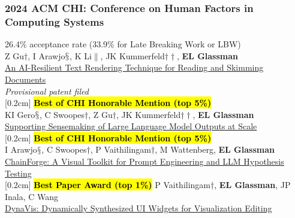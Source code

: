 \documentclass[10pt, a4paper]{article}
\newcommand{\years}[1]{\marginnote{\normalsize #1}}
\begin{document}
\subsubsection*{2024 ACM \textbf{CHI}: Conference on Human Factors in Computing Systems}
26.4\% acceptance rate (33.9\% for Late Breaking Work or LBW)\\

\years{\textbf{C35}} Z Gu$\dagger$, I Arawjo$\mathsection$, K Li$\|$, JK Kummerfeld$\dagger\dagger$, \textbf{EL Glassman}\\ \href{https://glassmanlab.seas.harvard.edu/papers/gptsm.pdf}{An AI-Resilient Text Rendering Technique for Reading and Skimming Documents}\\
\textit{Provisional patent filed}\\
[0.2cm]
\years{\textbf{C34}}\hl{\textbf{Best of CHI Honorable Mention (top 5\%)}}\\ KI Gero$\mathsection$, C Swoopes$\dagger$, Z Gu$\dagger$, JK Kummerfeld$\dagger\dagger$, \textbf{EL Glassman}\\ \href{https://glassmanlab.seas.harvard.edu/papers/mesotext.pdf}{Supporting Sensemaking of Large Language Model Outputs at Scale}\\
[0.2cm]
\years{\textbf{C33}}\hl{\textbf{Best of CHI Honorable Mention (top 5\%)}}\\ I Arawjo$\mathsection$, C Swoopes$\dagger$, P Vaithilingam$\dagger$, M Wattenberg, \textbf{EL Glassman}\\ \href{https://glassmanlab.seas.harvard.edu/papers/chainforge.pdf}{ChainForge: A Visual Toolkit for Prompt Engineering and LLM Hypothesis Testing}\\
[0.2cm]
\years{\textbf{C32}}\hl{\textbf{Best Paper Award (top 1\%)}} P Vaithilingam$\dagger$, \textbf{EL Glassman}, JP Inala, C Wang\\ \href{https://glassmanlab.seas.harvard.edu/papers/dynavis.pdf}{DynaVis: Dynamically Synthesized UI Widgets for Visualization Editing}\\
\end{document}
